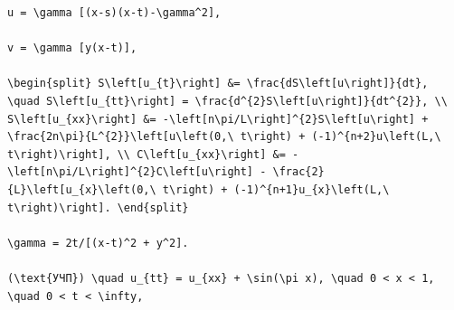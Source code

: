 \documentclass[
  ukrainian,
]{article}
\begin{document}
\begin{verbatim}
u = \gamma [(x-s)(x-t)-\gamma^2],

v = \gamma [y(x-t)],

\begin{split} S\left[u_{t}\right] &= \frac{dS\left[u\right]}{dt}, \quad S\left[u_{tt}\right] = \frac{d^{2}S\left[u\right]}{dt^{2}}, \\ S\left[u_{xx}\right] &= -\left[n\pi/L\right]^{2}S\left[u\right] + \frac{2n\pi}{L^{2}}\left[u\left(0,\ t\right) + (-1)^{n+2}u\left(L,\ t\right)\right], \\ C\left[u_{xx}\right] &= -\left[n\pi/L\right]^{2}C\left[u\right] - \frac{2}{L}\left[u_{x}\left(0,\ t\right) + (-1)^{n+1}u_{x}\left(L,\ t\right)\right]. \end{split}

\gamma = 2t/[(x-t)^2 + y^2].

(\text{УЧП}) \quad u_{tt} = u_{xx} + \sin(\pi x), \quad 0 < x < 1, \quad 0 < t < \infty,


\end{verbatim}
\end{document}
